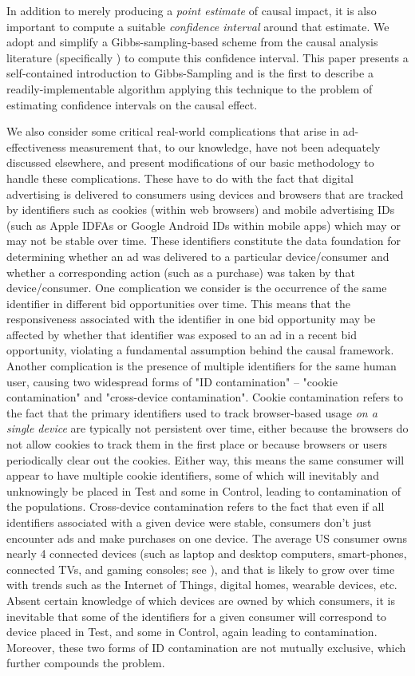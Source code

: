 \documentclass[11pt,a4paper]{article}
\theoremstyle{definition}
\theoremstyle{remark}
\theoremstyle{definition}
\theoremstyle{definition}
\theoremstyle{definition}
\theoremstyle{definition}
\theoremstyle{definition}
\theoremstyle{definition}
\begin{document}
In addition to merely producing a \textit{point estimate} of causal impact, it is also important to compute a suitable \textit{confidence interval} around that estimate. We adopt and simplify a Gibbs-sampling-based scheme from the causal analysis literature (specifically \cite{Chickering1996}) to compute this confidence interval. This paper presents a self-contained introduction to Gibbs-Sampling and is the first to describe a readily-implementable algorithm applying this technique to the problem of estimating confidence intervals on the causal effect. 

We also consider some critical real-world complications that arise in ad-effectiveness measurement that, to our knowledge, have not been adequately discussed elsewhere, and present modifications of our basic methodology to handle these complications. These have to do with the fact that digital advertising is delivered to consumers using devices and browsers that are tracked by identifiers such as cookies (within web browsers) and mobile advertising IDs (such as Apple IDFAs or Google Android IDs within mobile apps) which may or may not be stable over time. These identifiers constitute the data foundation for determining whether an ad was delivered to a particular device/consumer and whether a corresponding action (such as a purchase) was taken by that device/consumer. One complication we consider is the occurrence of the same identifier in different bid opportunities over time. This means that the responsiveness associated with the identifier in one bid opportunity may be affected by whether that identifier was exposed to an ad in a recent bid opportunity, violating a fundamental assumption behind the causal framework. Another complication is the presence of multiple identifiers for the same human user, causing two widespread forms of "ID contamination" -- "cookie contamination" and "cross-device contamination". Cookie contamination refers to the fact that the primary identifiers used to track browser-based usage \textit{on a single device} are typically not persistent over time, either because the browsers do not allow cookies to track them in the first place or because browsers or users periodically clear out the cookies. Either way, this means the same consumer will appear to have multiple cookie identifiers, some of which will inevitably and unknowingly be placed in Test and some in Control, leading to contamination of the populations. Cross-device contamination refers to the fact that even if all identifiers associated with a given device were stable, consumers don’t just encounter ads and make purchases on one device. The average US consumer owns nearly 4 connected devices (such as laptop and desktop computers, smart-phones, connected TVs, and gaming consoles; see   \cite{buckle-2016}),
and that is likely to grow over time with trends such as the Internet of Things, digital homes, wearable devices, etc. Absent certain knowledge of which devices are owned by which consumers, it is inevitable that some of the identifiers for a given consumer will correspond to device placed in Test, and some in Control, again leading to contamination. Moreover, these two forms of ID contamination are not mutually exclusive, which further compounds the problem.
\end{document}
